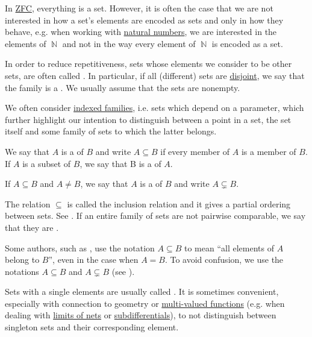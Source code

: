 \begin{remark}\label{rem:family_of_sets}
  In \hyperref[def:zfc]{ZFC}, everything is a set. However, it is often the case that we are not interested in how a set's elements are encoded as sets and only in how they behave, e.g. when working with \hyperref[def:set_of_natural_numbers]{natural numbers}, we are interested in the elements of \( \BbbN \) and not in the way every element of \( \BbbN \) is encoded as a set.

  In order to reduce repetitiveness, sets whose elements we consider to be other sets, are often called . In particular, if all (different) sets are \hyperref[def:subset]{disjoint}, we say that the family is a . We usually assume that the sets are nonempty.

  We often consider \hyperref[def:indexed_family]{indexed families}, i.e. sets which depend on a parameter, which further highlight our intention to distinguish between a point in a set, the set itself and some family of sets to which the latter belongs.
\end{remark}

\begin{definition}\label{def:subset}
  We say that \( A \) is a  of \( B \) and write \( A \subseteq B \) if every member of \( A \) is a member of \( B \). If \( A \) is a subset of \( B \), we say that B is a  of \( A \).

  If \( A \subseteq B \) and \( A \neq B \), we say that \( A \) is a  of \( B \) and write \( A \subsetneq B \).

  The relation \( \subseteq \) is called the inclusion relation and it gives a partial ordering between sets. See . If an entire family of sets are not pairwise comparable, we say that they are .
\end{definition}

\begin{remark}\label{rem:subset_notation}
  Some authors, such as \cite{Kelley1955}, use the notation \( A \subseteq B \) to mean \enquote{all elements of \( A \) belong to \( B \)}, even in the case when \( A = B \). To avoid confusion, we use the notations \( A \subseteq B \) and \( A \subsetneq B \) (see ).
\end{remark}

\begin{remark}\label{rem:singleton_sets}
  Sets with a single elements are usually called . It is sometimes convenient, especially with connection to geometry or \hyperref[def:multi_valued_function]{multi-valued functions} (e.g. when dealing with \hyperref[def:net_convergence/limit]{limits of nets} or \hyperref[def:subdifferentials]{subdifferentials}), to not distinguish between singleton sets and their corresponding element.
\end{remark}

